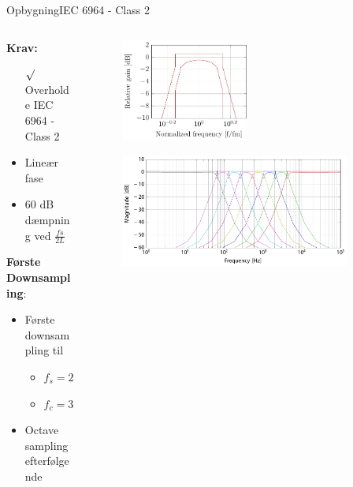 \begin{frame}{Opbygning}{IEC 6964 - Class 2}

\begin{columns}
  \begin{column}{0.4\textwidth}
\textbf{Krav:}
\begin{itemize}
\item[$\surd$] Overholde IEC 6964 - Class 2 
\item Lineær fase
\item 60 dB dæmpning ved $\frac{fs}{2L}$
\end{itemize}
\textbf{Første Downsampling}:
\begin{itemize}
	\item Første downsampling til
	\begin{itemize}
		\item $f_s=24 kHz$
		\item $f_c=3 kHz$
	\end{itemize} 
	\item Octave sampling efterfølgende
\end{itemize}
  \end{column}
  \begin{column}{0.6\textwidth}


\begin{figure}
\centering
\includegraphics[width=0.5\textwidth]{Band1ReqZoom}
\end{figure}
\vspace*{-8mm} 
\begin{figure}
\centering
\includegraphics[width=0.9\textwidth]{allBandsExtended}
\end{figure}
  \end{column}
\end{columns}
\end{frame}


